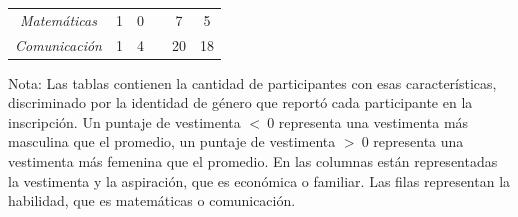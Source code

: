 \begin{table}[ht]
\begin{subtable}{\textwidth}
{\begin{tabular}{cccccc}
        \textit{Matemáticas}    & 1                   & 0                      & & 7                   & 5                      \\
        \textit{Comunicación}   & 1                   & 4                      & & 20                  & 18                     \\\hline \hline
        \end{tabular}}
    \end{subtable}
    \begin{threeparttable} 
    \begin{tablenotes}
    \footnotesize{
    \item Nota: Las tablas contienen la cantidad de participantes con esas características, discriminado por la identidad de género que reportó cada participante en la inscripción. Un puntaje de vestimenta $<\ 0$ representa una vestimenta más masculina que el promedio, un puntaje de vestimenta $>\ 0$ representa una vestimenta más femenina que el promedio. En las columnas están representadas la vestimenta y la aspiración, que es económica o familiar. Las filas representan la habilidad, que es matemáticas o comunicación.}
    \end{tablenotes}
    \end{threeparttable}
\end{table}

